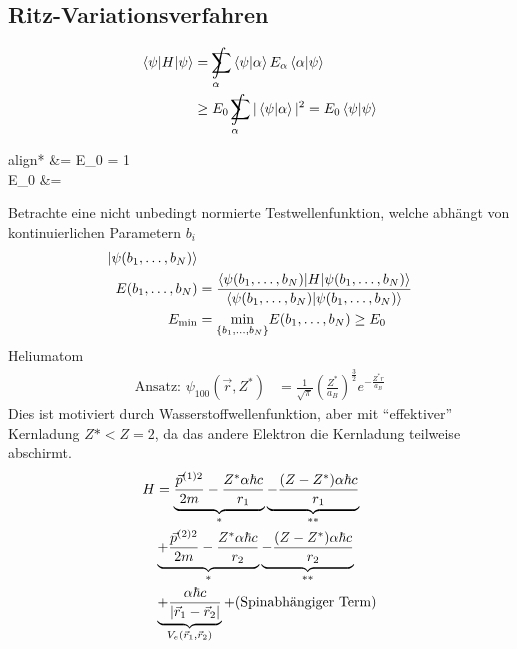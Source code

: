 \subsection{Ritz-Variationsverfahren}
	\begin{align*}	
	\braket{\psi | H | \psi} &= \int \limits_\alpha\!\!\!\!\!\!\!\!\!\;\sum
	\braket{\psi | \alpha} E_\alpha \braket{\alpha | \psi} \\
	&\geq E_0 \int \limits_\alpha\!\!\!\!\!\!\!\!\!\;\sum |\braket{\psi | \alpha}|^2 
	= E_0 \braket{\psi | \psi}
	\end{align*}
	\begin{empheq}[box=\boxed]{align*}
		\Rightarrow {} &= E_0  \braket{\psi | \psi} = 1 \\
		 E_0 &=  
	\end{empheq}
Betrachte eine nicht unbedingt normierte Testwellenfunktion, welche abhängt von kontinuierlichen Parametern $b_i$
	\begin{align*}
		\ket{\psi (b_1, \ldots, b_N)}& \\
		E(b_1, \ldots, b_N) &= 
		\frac{\braket{\psi (b_1, \ldots, b_N)|H|\psi (b_1, \ldots, b_N)}}{\braket{\psi (b_1, \ldots, b_N)|\psi (b_1, \ldots, b_N)}} \\
		E_{\text{min}} &= \underset{\{b_1, \ldots, b_N\}}{\mathrm{min}}
		E(b_1, \ldots, b_N) \geq E_0
	\end{align*}
Heliumatom
	\begin{align*}
		\text{Ansatz: } \psi_{100}(\vec{r}, Z^*)
		&= \frac{1}{\sqrt{\pi}} \left(\frac{Z^*}{a_B}\right)^{\frac{3}{2}} e^{-\frac{Z^* r}{a_B}}
	\end{align*}
Dies ist motiviert durch Wasserstoffwellenfunktion, aber mit ``effektiver'' Kernladung 
$Z* < Z = 2$, da das andere Elektron die Kernladung teilweise abschirmt.
	\begin{align*}
		H &= \underbrace{\frac{\vec{p}^{(1)2}}{2m} - \frac{Z^* \alpha \hbar c}{r_1}}_{\mathclap{*}}
		\underbrace{- \frac{(Z-Z^*)\alpha \hbar c}{r_1}}_{\mathclap{**}} \\
		&\underbrace{+ \frac{\vec{p}^{(2)2}}{2m} - \frac{Z^* \alpha \hbar c}{r_2}}_{\mathclap{*}}
		\underbrace{- \frac{(Z-Z^*)\alpha \hbar c}{r_2}}_{\mathclap{**}} \\
		&\underbrace{+ \frac{\alpha \hbar c}{|\vec{r}_1 - \vec{r}_2|}}_{\mathclap{V_e(\vec{r}_1, \vec{r}_2)}} + (\text{Spinabhängiger Term})
	\end{align*}
